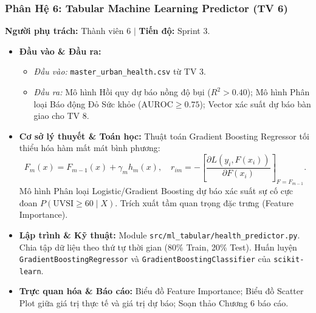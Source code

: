 \documentclass[11pt,a4paper]{article}
\begin{document}
\subsubsection{Phân Hệ 6: Tabular Machine Learning Predictor (TV 6)}
\textbf{Người phụ trách:} Thành viên 6 \quad $\vert$ \quad \textbf{Tiến độ:} Sprint 3.
\begin{itemize}[leftmargin=*]
    \item \textbf{Đầu vào \& Đầu ra:}
    \begin{itemize}
        \item \textit{Đầu vào:} \texttt{master\_urban\_health.csv} từ TV 3.
        \item \textit{Đầu ra:} Mô hình Hồi quy dự báo nồng độ bụi ($R^2 > 0.40$); Mô hình Phân loại Báo động Đỏ Sức khỏe ($\text{AUROC} \ge 0.75$); Vector xác suất dự báo bàn giao cho TV 8.
    \end{itemize}
    \item \textbf{Cơ sở lý thuyết \& Toán học:}
    Thuật toán Gradient Boosting Regressor tối thiểu hóa hàm mất mát bình phương:
    \begin{equation}
        F_m(x) = F_{m-1}(x) + \gamma_m h_m(x), \quad r_{im} = -\left[\frac{\partial L(y_i, F(x_i))}{\partial F(x_i)}\right]_{F=F_{m-1}}.
    \end{equation}
    Mô hình Phân loại Logistic/Gradient Boosting dự báo xác suất sự cố cực đoan $P(\text{UVSI} \ge 60 \mid X)$. Trích xuất tầm quan trọng đặc trưng (Feature Importance).
    \item \textbf{Lập trình \& Kỹ thuật:} Module \texttt{src/ml\_tabular/health\_predictor.py}. Chia tập dữ liệu theo thứ tự thời gian (80\% Train, 20\% Test). Huấn luyện \texttt{GradientBoostingRegressor} và \texttt{GradientBoostingClassifier} của \texttt{scikit-learn}.
    \item \textbf{Trực quan hóa \& Báo cáo:} Biểu đồ Feature Importance; Biểu đồ Scatter Plot giữa giá trị thực tế và giá trị dự báo; Soạn thảo Chương 6 báo cáo.
\end{itemize}
\end{document}
